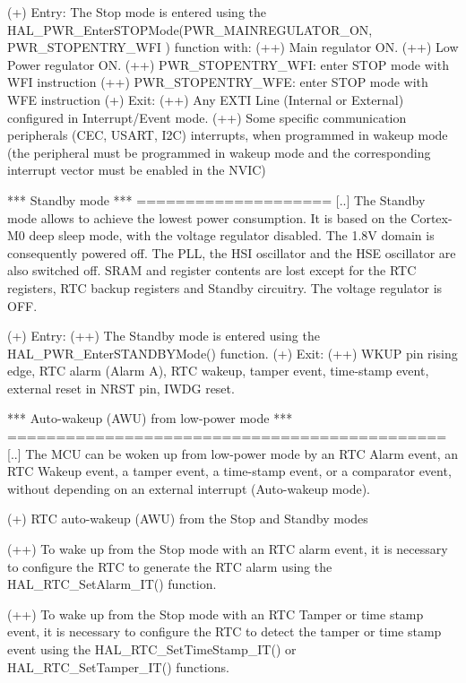 \begin{DoxyVerb}
      (+) Entry:
          The Stop mode is entered using the HAL_PWR_EnterSTOPMode(PWR_MAINREGULATOR_ON, PWR_STOPENTRY_WFI )
             function with:
          (++) Main regulator ON.
          (++) Low Power regulator ON.
          (++) PWR_STOPENTRY_WFI: enter STOP mode with WFI instruction
          (++) PWR_STOPENTRY_WFE: enter STOP mode with WFE instruction
      (+) Exit:
          (++) Any EXTI Line (Internal or External) configured in Interrupt/Event mode.
          (++) Some specific communication peripherals (CEC, USART, I2C) interrupts, 
               when programmed in wakeup mode (the peripheral must be 
               programmed in wakeup mode and the corresponding interrupt vector 
               must be enabled in the NVIC)

   *** Standby mode ***
   ====================
     [..]
      The Standby mode allows to achieve the lowest power consumption. It is based
      on the Cortex-M0 deep sleep mode, with the voltage regulator disabled.
      The 1.8V domain is consequently powered off. The PLL, the HSI oscillator and
      the HSE oscillator are also switched off. SRAM and register contents are lost
      except for the RTC registers, RTC backup registers and Standby circuitry.
      The voltage regulator is OFF.

      (+) Entry:
          (++) The Standby mode is entered using the HAL_PWR_EnterSTANDBYMode() function.
      (+) Exit:
          (++) WKUP pin rising edge, RTC alarm (Alarm A), RTC wakeup,
               tamper event, time-stamp event, external reset in NRST pin, IWDG reset.

   *** Auto-wakeup (AWU) from low-power mode ***
   =============================================
    [..]
      The MCU can be woken up from low-power mode by an RTC Alarm event, an RTC
      Wakeup event, a tamper event, a time-stamp event, or a comparator event, 
      without depending on an external interrupt (Auto-wakeup mode).

    (+) RTC auto-wakeup (AWU) from the Stop and Standby modes

      (++) To wake up from the Stop mode with an RTC alarm event, it is necessary to
            configure the RTC to generate the RTC alarm using the HAL_RTC_SetAlarm_IT() function.

      (++) To wake up from the Stop mode with an RTC Tamper or time stamp event, it
           is necessary to configure the RTC to detect the tamper or time stamp event using the
           HAL_RTC_SetTimeStamp_IT() or HAL_RTC_SetTamper_IT() functions.


\end{DoxyVerb}

